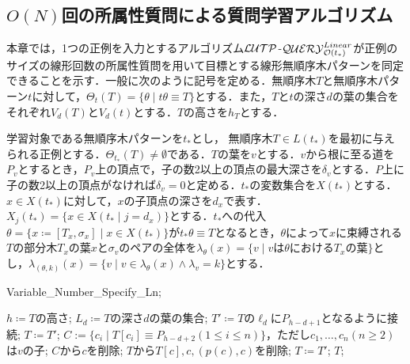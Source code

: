 \subsection{$O(N)$回の所属性質問による質問学習アルゴリズム}
本章では，1つの正例を入力とするアルゴリズム${\cal LUTP}$-${\cal QUERY}_{{\cal O}(t_{\ast})}^{Linear}$が正例のサイズの線形回数の所属性質問を用いて目標とする線形無順序木パターンを同定できることを示す．一般に次のように記号を定める．無順序木$T$と無順序木パターン$t$に対して，$\Theta_t(T)= \{\theta \mid t\theta\equiv T\}$とする．また，$T$と$t$の深さ$d$の葉の集合をそれぞれ$V_d(T)$と$V_d(t)$とする．$T$の高さを$h_T$とする．

学習対象である無順序木パターンを$t_{\ast}$とし， 無順序木$T\in L(t_{\ast})$を最初に与えられる正例とする．$\Theta_{t_{\ast}}(T)\neq\emptyset$である．$T$の葉を$v$とする．$v$から根に至る道を$P_v$とするとき，$P_v$上の頂点で，子の数2以上の頂点の最大深さを$\delta_v$とする．$P$上に子の数2以上の頂点がなければ$\delta_v=0$と定める．$t_{\ast}$の変数集合を$X(t_{\ast})$とする．$x\in X(t_{\ast})$に対して，$x$の子頂点の深さを$d_x$で表す．$X_j(t_{\ast})=\{x\in X(t_{\ast}\mid j=d_x)\}$とする．$t_{\ast}$への代入$\theta=\{x\coloneqq [T_x,\sigma_x]\mid x\in X(t_{\ast})\}$が$t_{\ast}\theta \equiv T$となるとき，$\theta$によって$x$に束縛される$T$の部分木$T_x$の葉$x$と$\sigma_v$のペアの全体を$\lambda_{\theta}(x)=\{v\mid v$は$\theta$における$T_x$の葉$\}$とし，$\lambda_{(\theta,k)}(x)=\{v\mid v\in \lambda_{\theta}(x)\land \lambda_v=k\}$とする．

\begin{algorithm}[tb]
\caption{{\sc Variable\_Number\_Specify\_Ln};} \label{alg:lutp-query-linear-step1}
\begin{algorithmic}[1]
    \State $h\coloneqq T$の高さ;
      \State $L_d\coloneqq T$の深さ$d$の葉の集合;
    \EndFor
        \State $T'\coloneqq T$の$\ell_d$に$P_{h-d+1}$となるように接続;
          \State $T\coloneqq T'$;
        \EndIf
      \EndFor
        \State $C := \{c_i\mid T[c_i]\equiv P_{h-d+2}(1\leq i\leq n)\}$，ただし$c_1,\ldots,c_n(n\geq 2)$は$v$の子;
            \State $C$から$c$を削除; %
            \State $T$から$T[c],c,(p(c),c)$を削除;
              \State $T\coloneqq T'$;
            \EndIf
          \EndIf
        \EndFor
      \EndFor
    \EndFor
    \State \Return $T$;
  \EndFunction
\end{algorithmic}
\end{algorithm}

